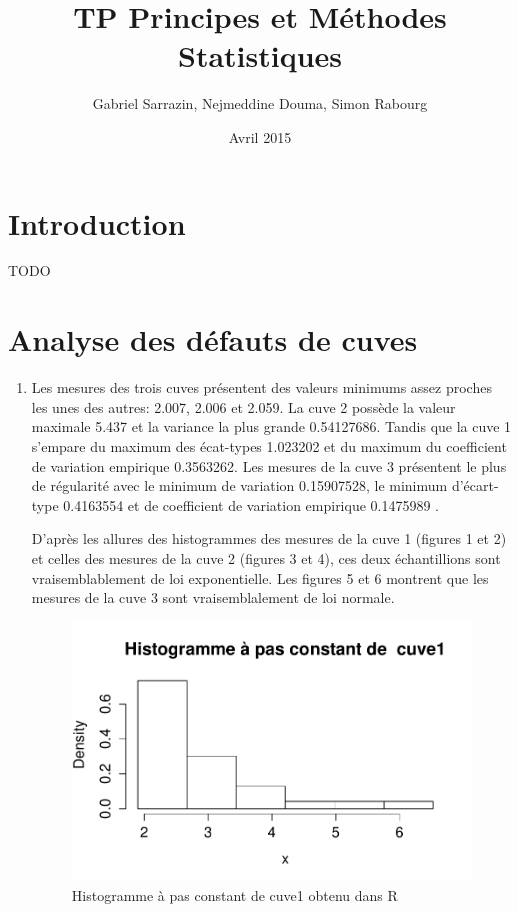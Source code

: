 \documentclass[a4paper,11pt]{article}
\title{TP Principes et M\'{e}thodes Statistiques}
\author{Gabriel Sarrazin, Nejmeddine Douma, Simon Rabourg}
\date{Avril 2015}
\begin{document}

\maketitle



\section{Introduction}

TODO

\section{Analyse des défauts de cuves}

\begin{enumerate}

\item Les mesures des trois cuves présentent des valeurs minimums assez proches les unes des autres: 2.007, 2.006 et 2.059. La cuve 2 possède la valeur maximale 5.437 et la variance la plus grande 0.54127686. Tandis que la cuve 1 s'empare du maximum des écat-types 1.023202 et du maximum du coefficient de variation empirique 0.3563262. Les mesures de la cuve 3 présentent le plus de régularité avec le minimum de variation 0.15907528, le minimum d'écart-type 0.4163554 et de coefficient de variation empirique 0.1475989 .

D'après les allures des histogrammes des mesures de la cuve 1 (figures 1 et 2) et celles des mesures de la cuve 2 (figures 3 et 4), ces deux échantillions sont vraisemblablement de loi exponentielle. Les figures 5 et 6 montrent que les mesures de la cuve 3 sont vraisemblalement de loi normale.

\begin{figure}[t]
\centering
\includegraphics[width=1.0\textwidth]{figures/histopas_cuve1.pdf}
\caption{Histogramme à pas constant de cuve1 obtenu dans R}
\end{figure}


\end{enumerate}
\end{document}
